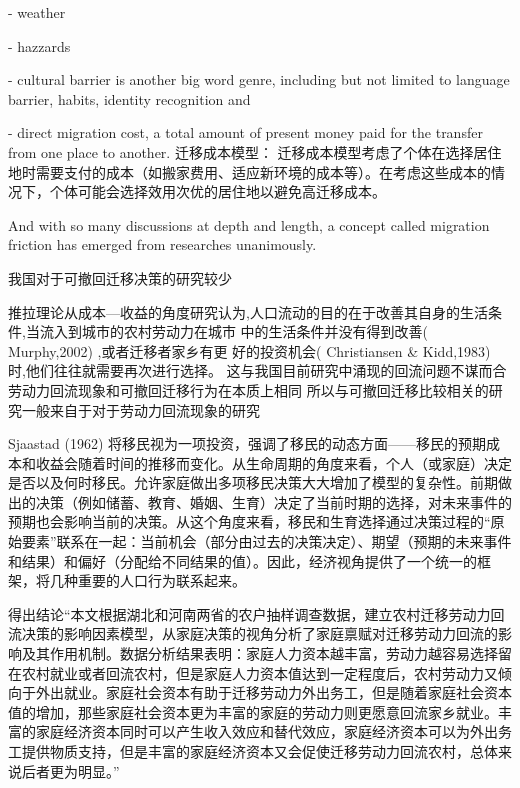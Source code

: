 \documentclass[a4paper,12pt,oneside]{book} %
\begin{document}
- weather

- hazzards

- cultural barrier is another big word genre, including but not limited to language barrier, habits, identity recognition and 

- direct migration cost, a total amount of present money paid for the transfer from one place to another. 迁移成本模型： 迁移成本模型考虑了个体在选择居住地时需要支付的成本（如搬家费用、适应新环境的成本等）。在考虑这些成本的情况下，个体可能会选择效用次优的居住地以避免高迁移成本。

And with so many discussions at depth and length, a concept called migration friction has emerged from researches unanimously. 




















我国对于可撤回迁移决策的研究较少

推拉理论从成本—收益的角度研究认为,人口流动的目的在于改善其自身的生活条件,当流入到城市的农村劳动力在城市  中的生活条件并没有得到改善( Murphy,2002) ,或者迁移者家乡有更  好的投资机会( Christiansen \& Kidd,1983) 时,他们往往就需要再次进行选择。
这与我国目前研究中涌现的回流问题不谋而合
劳动力回流现象和可撤回迁移行为在本质上相同
所以与可撤回迁移比较相关的研究一般来自于对于劳动力回流现象的研究


Sjaastad (1962) 将移民视为一项投资，强调了移民的动态方面——移民的预期成本和收益会随着时间的推移而变化。从生命周期的角度来看，个人（或家庭）决定是否以及何时移民。允许家庭做出多项移民决策大大增加了模型的复杂性。前期做出的决策（例如储蓄、教育、婚姻、生育）决定了当前时期的选择，对未来事件的预期也会影响当前的决策。从这个角度来看，移民和生育选择通过决策过程的“原始要素”联系在一起：当前机会（部分由过去的决策决定）、期望（预期的未来事件和结果）和偏好（分配给不同结果的值）。因此，经济视角提供了一个统一的框架，将几种重要的人口行为联系起来。


\cite{ShiZhiLeiJiaTingBingFuJiaTingJueCeYuNongCunQianYiLaoDongLiHuiLiu2012}得出结论“本文根据湖北和河南两省的农户抽样调查数据，建立农村迁移劳动力回流决策的影响因素模型，从家庭决策的视角分析了家庭禀赋对迁移劳动力回流的影响及其作用机制。数据分析结果表明：家庭人力资本越丰富，劳动力越容易选择留在农村就业或者回流农村，但是家庭人力资本值达到一定程度后，农村劳动力又倾向于外出就业。家庭社会资本有助于迁移劳动力外出务工，但是随着家庭社会资本值的增加，那些家庭社会资本更为丰富的家庭的劳动力则更愿意回流家乡就业。丰富的家庭经济资本同时可以产生收入效应和替代效应，家庭经济资本可以为外出务工提供物质支持，但是丰富的家庭经济资本又会促使迁移劳动力回流农村，总体来说后者更为明显。”
\end{document}
